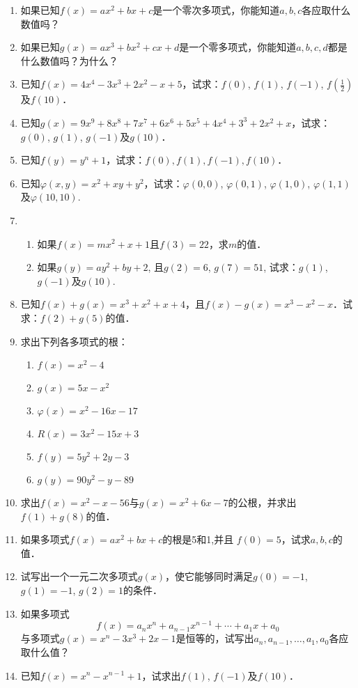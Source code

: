 \begin{enumerate}
\item 如果已知$f(x)=ax^2+bx+c$是一个零次多项式，你能知道$a,b,c$各应取什么数值吗？
\item 如果已知$g(x)=ax^3+bx^2+cx+d$是一个零多项式，你能知道$a,b,c,d$都是什么数值吗？为什么？
\item 已知$f(x)=4x^4-3x^3+2x^2-x+5$，试求：$f(0)$, $f(1)$, $f(-1)$, $f\left(\frac{1}{2}\right)$及$f(10)$．
\item 已知$g(x)=9x^9+8x^8+7x^7+6x^6+5x^5+4x^4+3^3+2x^2+x$，试求：$g(0)$, $g(1)$, $g(-1)$及$g(10)$．

\item 已知$f(y)=y^n+1$，试求：$f(0),f(1),f(-1),f(10)$．

\item 已知$\varphi(x,y)=x^2+xy+y^2$，试求：$\varphi(0, 0)$, $\varphi(0, 1)$, $\varphi(1, 0)$, $\varphi(1, 1)$及$\varphi(10, 10)$.
\item \begin{enumerate}
    \item 如果$f(x)=mx^2+x+1$且$f(3)=22$，求$m$的值．
    \item 如果$g(y)=ay^2+by+2$, 且$g(2)=6$, $g (7)=51$, 试求：$g(1)$, $g(-1)$及$g(10)$.
\end{enumerate} 

\item 已知$f(x)+g(x)=x^3+x^2+x+4$，且$f(x)-g(x)=x^3-x^2-x$．试求：$f(2)+g(5)$的值．
\item 求出下列各多项式的根：
    \begin{multicols}{2}
\begin{enumerate}
    \item $f (x) =x^2-4$
    \item $g (x) =5x-x^2$
    \item $\varphi (x) =x^2-16x-17$
    \item $R(x)=3x^2-15x+3$
    \item $f(y)=5y^2+2y-3$
    \item $g(y)=90y^2-y-89$
\end{enumerate}
 \end{multicols}

\item 求出$f(x)=x^2-x-56$与$g(x)=x^2+6x-7$的公根，并求出$f(1)+g(8)$的值．
\item 如果多项式$f(x)=ax^2+bx+c$的根是5和1,并且
$f(0)=5$，试求$a,b,c$的值．
\item 试写出一个一元二次多项式$g(x)$，使它能够同时满足$g(0)=-1$, $g(1)=-1$, $g(2)=1$的条件．
\item 如果多项式
\[f (x) =a_nx^n+a_{n-1} x^{n-1}+\cdots+a_1x+a_0\]
与多项式$g(x)=x^n-3x^3+2x-1$是恒等的，试写出$a_n,a_{n-1},\ldots,a_1,a_0$各应取什么值？
\item 已知$f(x)=x^n-x^{n-1}+1$，试求出$f(1)$, $f(-1)$及$f (10)$．

\end{enumerate}


